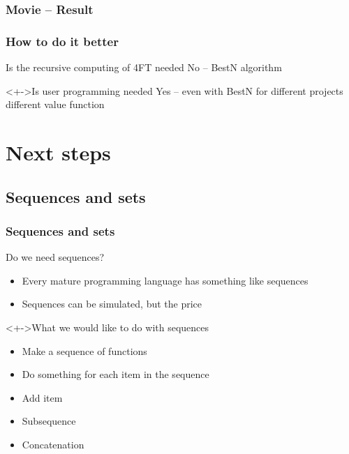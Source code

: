 \documentclass{beamer}
\begin{document}
\begin{frame}
	\frametitle{Movie -- Result}
\end{frame}

\begin{frame}
	\frametitle{How to do it better}
	\begin{block}{Is the recursive computing of 4FT needed}
		\pause No -- BestN algorithm
	\end{block}
	\begin{block}<+->{Is user programming needed}
		\pause Yes -- even with BestN for different projects different value function
	\end{block}
\end{frame}

\section{Next steps}
\subsection{Sequences and sets}
\begin{frame}
	\frametitle{Sequences and sets}
	\begin{block}{Do we need sequences?}
		\begin{itemize}[<+->]
			\item Every mature programming language has something like sequences
			\item Sequences can be simulated, but the price
		\end{itemize}	
	\end{block}
	\begin{block}<+->{What we would like to do with sequences}
		\begin{itemize}[<+->]
			\item Make a sequence of functions
			\item Do something for each item in the sequence
			\item Add item
			\item Subsequence
			\item Concatenation 
		\end{itemize}	
	\end{block}
\end{frame}
\end{document}

